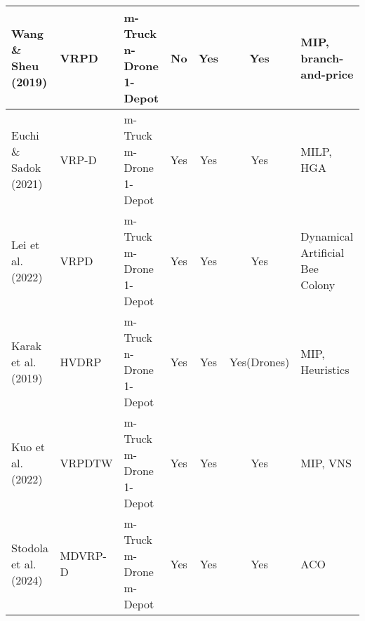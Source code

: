 \begin{table*}[]
{\begin{tabular}{@{}lllcccl@{}}
			Wang \& Sheu (2019) & VRPD & m-Truck n-Drone 1-Depot & No & Yes & Yes & MIP, branch-and-price \\
			\midrule
			Euchi \& Sadok (2021) & VRP-D & m-Truck m-Drone 1-Depot & Yes & Yes & Yes & MILP, HGA \\
			\midrule
			Lei et al. (2022) & VRPD & m-Truck m-Drone 1-Depot & Yes & Yes & Yes & Dynamical Artificial Bee Colony \\
			\midrule
			Karak et al. (2019) & HVDRP & m-Truck n-Drone 1-Depot & Yes & Yes & Yes(Drones) & MIP, Heuristics \\
			\midrule
			Kuo et al. (2022) & VRPDTW & m-Truck m-Drone 1-Depot & Yes & Yes & Yes & MIP, VNS \\
			\midrule
			Stodola et al. (2024) & MDVRP-D & m-Truck m-Drone m-Depot & Yes & Yes & Yes & ACO \\
			\bottomrule
		\end{tabular}%
	}
\end{table*}